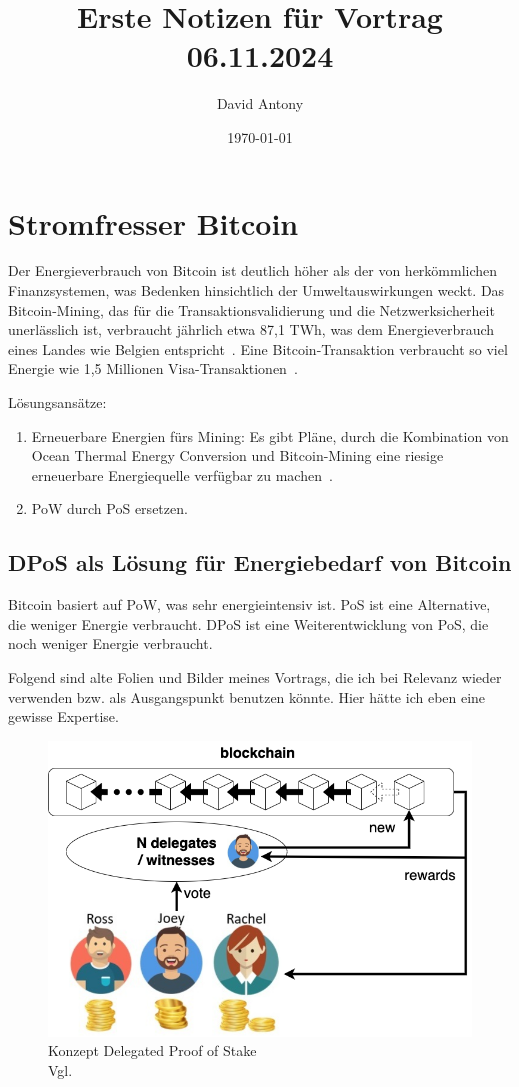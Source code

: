 \documentclass{article}
\title{Erste Notizen für Vortrag 06.11.2024}
\author{David Antony}
\date{\today}
\begin{document}
\maketitle

\section{Stromfresser Bitcoin}
Der Energieverbrauch von Bitcoin ist deutlich höher als der von herkömmlichen Finanzsystemen,
was Bedenken hinsichtlich der Umweltauswirkungen weckt.
Das Bitcoin-Mining, das für die Transaktionsvalidierung und die Netzwerksicherheit unerlässlich ist,
verbraucht jährlich etwa 87,1 TWh, was dem Energieverbrauch eines Landes wie Belgien entspricht~\cite{DEVRIES2020101721}.
Eine Bitcoin-Transaktion verbraucht so viel Energie wie 1,5 Millionen Visa-Transaktionen~\cite{9829550}.

Lösungsansätze:
\begin{enumerate}
	\item Erneuerbare Energien fürs Mining: Es gibt Pläne, durch die Kombination von Ocean Thermal Energy Conversion und Bitcoin-Mining eine riesige erneuerbare Energiequelle verfügbar zu machen~\cite{9829550}.
	\item PoW durch PoS ersetzen.
\end{enumerate}

\subsection{DPoS als Lösung für Energiebedarf von Bitcoin}
Bitcoin basiert auf PoW, was sehr energieintensiv ist.
PoS ist eine Alternative, die weniger Energie verbraucht.
DPoS ist eine Weiterentwicklung von PoS, die noch weniger Energie verbraucht.

Folgend sind alte Folien und Bilder meines Vortrags, die ich bei Relevanz wieder verwenden bzw. als Ausgangspunkt benutzen könnte.
Hier hätte ich eben eine gewisse Expertise.

\begin{figure}
	\centering
	\includegraphics[scale=0.35]{img/DPoSKonzept.png}
	\caption{Konzept Delegated Proof of Stake\\Vgl. \cite{li2020comparison, nakuri} }
	\label{fig:konzept}
\end{figure}
\end{document}
